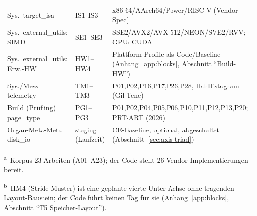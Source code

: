 \begin{nurkurz}
\begin{table}[!htbp]
\begin{tabular}{@{}l l p{6.8cm}@{}}
    \midrule
    Sys.\ target\_isa & IS1--IS3 & x86-64/AArch64/Power/RISC-V (Vendor-Spec) \\
    Sys.\ external\_utils: SIMD & SE1--SE3 & SSE2/AVX2/AVX-512/NEON/SVE2/RVV\@; GPU\@: CUDA \\
    Sys.\ external\_utils: Erw.-HW & HW1--HW4 & Plattform-Profile als Code/Baseline (Anhang~\ref{app:blocks}, Abschnitt \enquote{Build-HW}) \\
    Sys./Mess telemetry & TM1--TM3 & P01,P02,P16,P17,P26,P28; HdrHistogram (Gil Tene) \\
    Build (Prüfling) page\_type & PG1--PG3 & P01,P02,P04,P05,P06,P10,P11,P12,P13,P20; PRT-ART (2026) \\
    Organ-Meta-Meta disk\_io & staging (Laufzeit) & CE-Baseline; optional, abgeschaltet (Abschnitt~\ref{sec:axis-triad}) \\
    \bottomrule
  \end{tabular}

  \smallskip
  {\footnotesize \textsuperscript{a}~Korpus 23 Arbeiten (A01--A23); der Code stellt 26 Vendor-Implementierungen bereit.\par}
  {\footnotesize \textsuperscript{b}~HM4 (Stride-Muster) ist eine geplante vierte Unter-Achse ohne tragenden Layout-Baustein; der Code führt keinen Tag für sie (Anhang~\ref{app:blocks}, Abschnitt \enquote{T5 Speicher-Layout}).\par}
\end{table}
\end{nurkurz}

